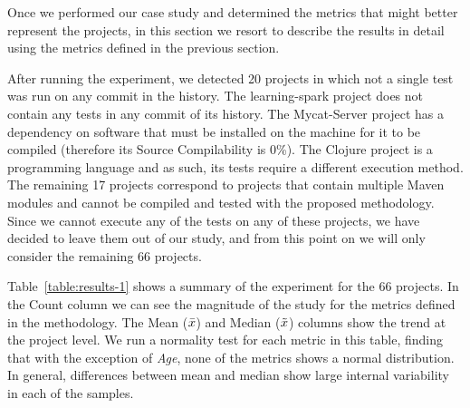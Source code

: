 Once we performed our case study and determined the metrics that might better represent the projects, in this section we resort to describe the results in detail using the metrics defined in the previous section.

After running the experiment, we detected 20 projects in which not a single test was run on any commit in the history. 
The learning-spark project does not contain any tests in any commit of its history. 
The Mycat-Server project has a dependency on software that must be installed on the machine for it to be compiled (therefore its Source Compilability is 0\%). 
The Clojure project is a programming language and as such, its tests require a different execution method. 
The remaining 17 projects correspond to projects that contain multiple Maven modules and cannot be compiled and tested with the proposed methodology. 
Since we cannot execute any of the tests on any of these projects, we have decided to leave them out of our study, and from this point on we will only consider the remaining 66 projects.

Table~\ref{table:results-1} shows a summary of the experiment for the 66 projects. 
In the Count column we can see the magnitude of the study for the metrics defined in the methodology. 
The Mean ({\large$\bar{x}$}) and Median ({\large$\tilde{x}$}) columns show the trend at the project level.
We run a normality test for each metric in this table, finding that with the exception of \textit{Age}, none of the metrics shows a normal distribution. 
In general, differences between mean and median show large internal variability in each of the samples.

